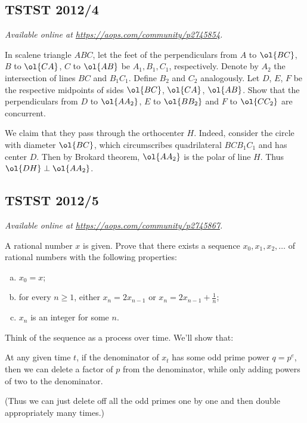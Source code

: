 \documentclass[11pt]{scrartcl}
\begin{document}
\subsection{TSTST 2012/4}
\textsl{Available online at \url{https://aops.com/community/p2745854}.}
\begin{mdframed}[style=mdpurplebox,frametitle={Problem statement}]
In scalene triangle $ABC$, let the feet of the perpendiculars
from $A$ to $\ol{BC}$, $B$ to $\ol{CA}$, $C$ to $\ol{AB}$
be $A_1, B_1, C_1$, respectively.
Denote by $A_2$ the intersection of lines $BC$ and $B_1C_1$.
Define $B_2$ and $C_2$ analogously.
Let $D$, $E$, $F$ be the respective midpoints
of sides $\ol{BC}$, $\ol{CA}$, $\ol{AB}$.
Show that the perpendiculars from $D$ to $\ol{AA_2}$,
$E$ to $\ol{BB_2}$ and $F$ to $\ol{CC_2}$ are concurrent.
\end{mdframed}
We claim that they pass through the orthocenter $H$.
Indeed, consider the circle with diameter $\ol{BC}$,
which circumscribes quadrilateral $BCB_1C_1$ and has center $D$.
Then by Brokard theorem, $\ol{AA_2}$ is the polar of line $H$.
Thus $\ol{DH} \perp \ol{AA_2}$.
\pagebreak

\subsection{TSTST 2012/5}
\textsl{Available online at \url{https://aops.com/community/p2745867}.}
\begin{mdframed}[style=mdpurplebox,frametitle={Problem statement}]
A rational number $x$ is given.
Prove that there exists a sequence
$x_0, x_1, x_2, \dots$ of rational numbers
with the following properties:
\begin{enumerate}[(a)]
  \item $x_0=x$;
  \item for every $n\ge1$, either $x_n = 2x_{n-1}$ or $x_n = 2x_{n-1} + \frac{1}{n}$;
  \item $x_n$ is an integer for some $n$.
\end{enumerate}
\end{mdframed}
Think of the sequence as a process over time.
We'll show that:
\begin{claim*}
  At any given time $t$,
  if the denominator of $x_t$ has some odd prime power $q = p^e$,
  then we can delete a factor of $p$ from the denominator,
  while only adding powers of two to the denominator.
\end{claim*}
(Thus we can just delete off all the odd primes one by one
and then double appropriately many times.)
\end{document}
